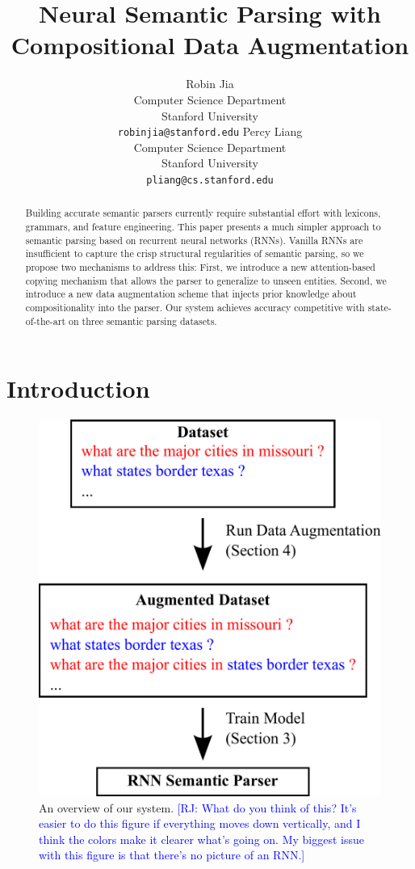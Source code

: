 \documentclass[11pt,letterpaper]{article}
\title{Neural Semantic Parsing with Compositional Data Augmentation}
\author{Robin Jia\\
	    Computer Science Department\\
      Stanford University\\
	    {\tt robinjia@stanford.edu}
	  \And
    Percy Liang\\
    Computer Science Department\\
  	Stanford University\\
  {\tt pliang@cs.stanford.edu}}
\date{}
\newcommand{\regex}{\textsc{Regex}\xspace}
\newcommand\rj[1]{\textcolor{blue}{[RJ: #1]}}
\begin{document}
\maketitle

\begin{abstract}
Building accurate semantic parsers currently require substantial effort
with lexicons, grammars, and feature engineering.
This paper presents a much simpler approach to semantic parsing based on
recurrent neural networks (RNNs).
Vanilla RNNs are insufficient to capture the crisp structural regularities of
semantic parsing,
so we propose two mechanisms to address this:
First, we introduce a new attention-based copying mechanism that
allows the parser to generalize to unseen entities.
Second, we introduce a new data augmentation scheme
that injects prior knowledge about compositionality into the parser.
Our system achieves accuracy competitive with state-of-the-art
on three semantic parsing datasets.
\end{abstract}

\section{Introduction}
\begin{figure}[t] 
\small
\begin{center} 
  \includegraphics[scale=0.4]{fig-overview.pdf}
\end{center} 
\caption{An overview of our system.
  \rj{What do you think of this?  It's easier to do this figure
    if everything moves down vertically, and I think the colors
  make it clearer what's going on.
My biggest issue with this figure is that there's no picture of an RNN.}
}
\label{fig:overview}
\end{figure}
\end{document}
